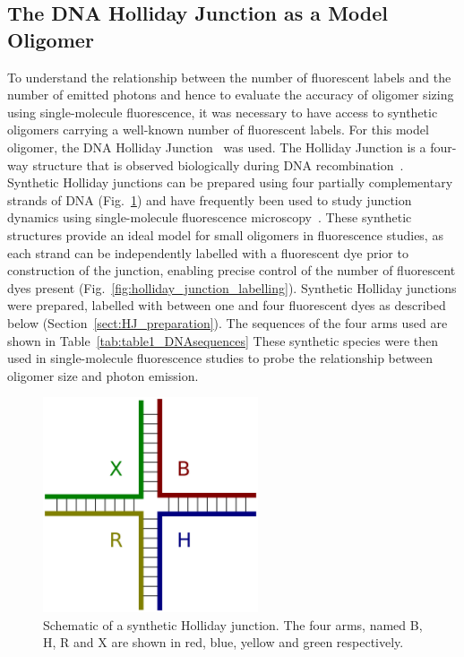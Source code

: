 \subsection{The DNA Holliday Junction as a Model Oligomer}
To understand the relationship between the number of fluorescent labels and the number of emitted photons and hence to evaluate the accuracy of oligomer sizing using single-molecule fluorescence, it was necessary to have access to synthetic oligomers carrying a well-known number of fluorescent labels. For this model oligomer, the DNA Holliday Junction~\cite{holliday1964} was used. The Holliday Junction is a four-way structure that is observed biologically during DNA recombination~\cite{potter1976}. Synthetic Holliday junctions can be prepared using four partially complementary strands of DNA (Fig.~\ref{fig:holliday_junction}) and have frequently been used to study junction dynamics using single-molecule fluorescence microscopy~\cite{mckinney03, uphoff2010, Hyeon2012}. These synthetic structures provide an ideal model for small oligomers in fluorescence studies, as each strand can be independently labelled with a fluorescent dye prior to construction of the junction, enabling precise control of the number of fluorescent dyes present (Fig.~\ref{fig:holliday_junction_labelling}). Synthetic Holliday junctions were prepared, labelled with between one and four fluorescent dyes as described below (Section~\ref{sect:HJ_preparation}). The sequences of the four arms used are shown in Table~\ref{tab:table1_DNAsequences} These synthetic species were then used in single-molecule fluorescence studies to probe the relationship between oligomer size and photon emission.

\begin{figure}
   \begin{center}
      \includegraphics*[clip=true, width=2.5in]{sizing/holliday_junction.pdf}
      \caption{Schematic of a synthetic Holliday junction. The four arms, named B, H, R and X are shown in red, blue, yellow and green respectively.}
      \label{fig:holliday_junction}
   \end{center}
\end{figure}

